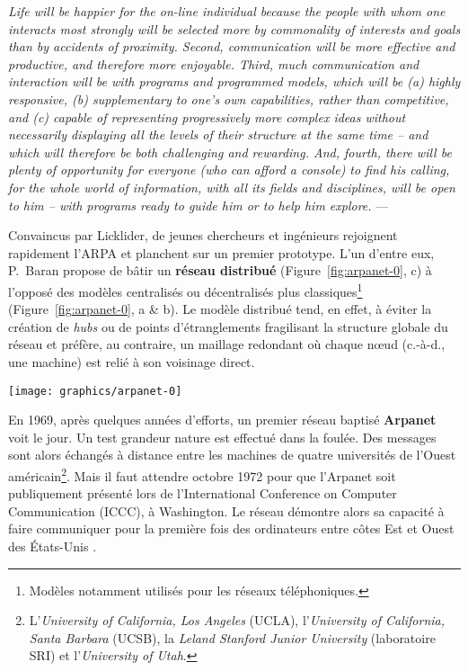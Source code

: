 \documentclass[symmetric,justified,marginals=raggedouter]{tufte-book}
\begin{document}
\begin{fullwidth}
\og\textit{Life will be happier for the on-line individual because the people with whom one interacts most strongly will be selected more by commonality of interests and goals than by accidents of proximity. Second, communication will be more effective and productive, and therefore more enjoyable. Third, much communication and interaction will be with programs and programmed models, which will be (a) highly responsive, (b) supplementary to one’s own capabilities, rather than competitive, and (c) capable of representing progressively more complex ideas without necessarily displaying all the levels of their structure at the same time -- and which will therefore be both challenging and rewarding. And, fourth, there will be plenty of opportunity for everyone (who can afford a console) to find his calling, for the whole world of information, with all its fields and disciplines, will be open to him – with programs ready to guide him or to help him explore.}\fg{} --- \citep[p.21]{licklider_computer_1968}\\
\end{fullwidth}

\noindent Convaincus par Licklider, de jeunes chercheurs et ingénieurs rejoignent rapidement l'ARPA et planchent sur un premier prototype. L'un d'entre eux, P.~Baran propose de bâtir un \textbf{réseau distribué} (Figure~\ref{fig:arpanet-0}, c) à l'opposé des modèles centralisés ou décentralisés plus classiques\footnote{\RaggedOuter Modèles notamment utilisés pour les réseaux téléphoniques.} (Figure~\ref{fig:arpanet-0}, a \& b). Le modèle distribué tend, en effet, à éviter la création de \textit{hubs} ou de points d'étranglements fragilisant la structure globale du réseau et préfère, au contraire, un maillage redondant où chaque nœud (c.-à-d., une machine) est relié à son voisinage direct. 

\newpage

\begin{figure*}
  \texttt{[image: graphics/arpanet-0]}
  \caption{Trois modèles de réseaux : centralisé (a), décentralisé (b), distribué (c)}
  \label{fig:arpanet-0}
\end{figure*} 

\noindent En 1969, après quelques années d'efforts, un premier réseau baptisé \textbf{Arpanet} voit le jour. Un test grandeur nature est effectué dans la foulée. Des messages sont alors échangés à distance entre les machines de quatre universités de l'Ouest américain\footnote{\RaggedOuter L'\textit{University of California, Los Angeles} (UCLA), l'\textit{University of California, Santa Barbara} (UCSB), la \textit{Leland Stanford Junior University} (laboratoire SRI) et l'\textit{University of Utah}.}. Mais il faut attendre octobre 1972 pour que l'Arpanet soit publiquement présenté lors de l'International Conference on Computer Communication (ICCC), à Washington. Le réseau démontre alors sa capacité à faire communiquer pour la première fois des ordinateurs entre côtes Est et Ouest des États-Unis \citep[p.175-186]{hafner_where_1998}.
\end{document}
